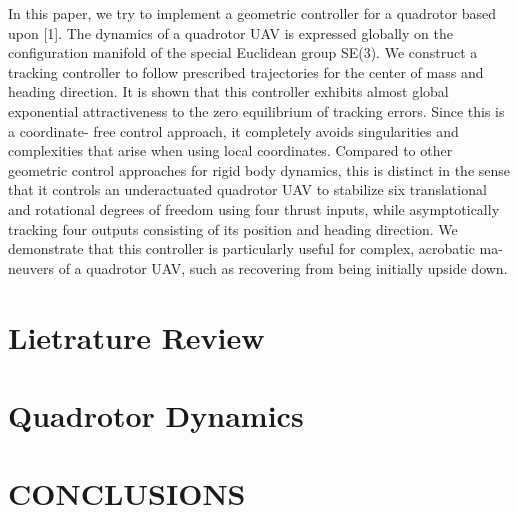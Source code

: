 \documentclass[letterpaper, 10 pt, conference]{ieeeconf}  %
\begin{document}
In this paper, we try to implement a geometric controller for
a quadrotor based upon [1]. The dynamics of a quadrotor UAV is
expressed globally on the configuration manifold of the
special Euclidean group SE(3). We construct a tracking
controller to follow prescribed trajectories for the center of
mass and heading direction. It is shown that this controller
exhibits almost global exponential attractiveness to the zero
equilibrium of tracking errors. Since this is a coordinate-
free control approach, it completely avoids singularities and
complexities that arise when using local coordinates.
Compared to other geometric control approaches for rigid
body dynamics, this is distinct in the sense that it controls
an underactuated quadrotor UAV to stabilize six translational
and rotational degrees of freedom using four thrust inputs,
while asymptotically tracking four outputs consisting of its
position and heading direction. We demonstrate that this
controller is particularly useful for complex, acrobatic ma-
neuvers of a quadrotor UAV, such as recovering from being
initially upside down.



\section{Lietrature Review}


\section{Quadrotor Dynamics}


\section{CONCLUSIONS}


\addtolength{\textheight}{-12cm}   %

\end{document}
